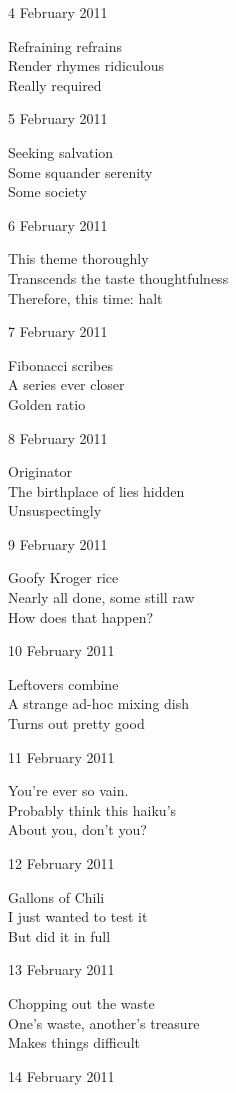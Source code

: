\documentclass[12pt]{article}
\begin{document}
4 February 2011

Refraining refrains \\
Render rhymes ridiculous \\
Really required

5 February 2011

Seeking salvation \\
Some squander serenity \\
Some society

6 February 2011

This theme thoroughly \\
Transcends the taste thoughtfulness \\
Therefore, this time: halt

7 February 2011

Fibonacci scribes \\
A series ever closer \\
Golden ratio


\newpage

8 February 2011

Originator \\
The birthplace of lies hidden \\
Unsuspectingly

9 February 2011

Goofy Kroger rice \\
Nearly all done, some still raw \\
How does that happen?

10 February 2011

Leftovers combine \\
A strange ad-hoc mixing dish \\
Turns out pretty good

11 February 2011

You're ever so vain. \\
Probably think this haiku's \\
About you, don't you?

12 February 2011

Gallons of Chili \\
I just wanted to test it \\
But did it in full

13 February 2011

Chopping out the waste \\
One's waste, another's treasure \\
Makes things difficult

14 February 2011
\end{document}
